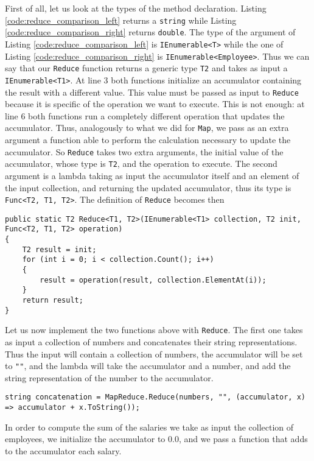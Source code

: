 \noindent
First of all, let us look at the types of the method declaration. Listing \ref{code:reduce_comparison_left} returns a \texttt{string} while Listing  \ref{code:reduce_comparison_right} returns \texttt{double}. The type of the argument of Listing \ref{code:reduce_comparison_left} is \texttt{IEnumerable<T>} while the one of Listing \ref{code:reduce_comparison_right} is \texttt{IEnumerable<Employee>}. Thus we can say that our \texttt{Reduce} function returns a generic type \texttt{T2} and takes as input a \texttt{IEnumerable<T1>}. At line 3 both functions initialize an accumulator containing the result with a different value. This value must be passed as input to \texttt{Reduce} because it is specific of the operation we want to execute. This is not enough: at line 6 both functions run a completely different operation that updates the accumulator. Thus, analogously to what we did for \texttt{Map}, we pass as an extra argument a function able to perform the calculation necessary to update the accumulator. So \texttt{Reduce} takes two extra arguments, the initial value of the accumulator, whose type is \texttt{T2}, and the operation to execute. The second argument is a lambda taking as input the accumulator itself and an element of the input collection, and returning the updated accumulator, thus its type is \texttt{Func<T2, T1, T2>}. The definition of \texttt{Reduce} becomes then

\begin{lstlisting}
public static T2 Reduce<T1, T2>(IEnumerable<T1> collection, T2 init, Func<T2, T1, T2> operation)
{
	T2 result = init;
	for (int i = 0; i < collection.Count(); i++)
	{
		result = operation(result, collection.ElementAt(i));
	}
	return result;
}
\end{lstlisting}

\noindent
Let us now implement the two functions above with \texttt{Reduce}. The first one takes as input a collection of numbers and concatenates their string representations. Thus the input will contain a collection of numbers, the accumulator will be set to \texttt{""}, and the lambda will take the accumulator and a number, and add the string representation of the number to the accumulator.

\begin{lstlisting}
string concatenation = MapReduce.Reduce(numbers, "", (accumulator, x) => accumulator + x.ToString());
\end{lstlisting}

In order to compute the sum of the salaries we take as input the collection of employees, we initialize the accumulator to 0.0, and we pass a function that adds to the accumulator each salary.

